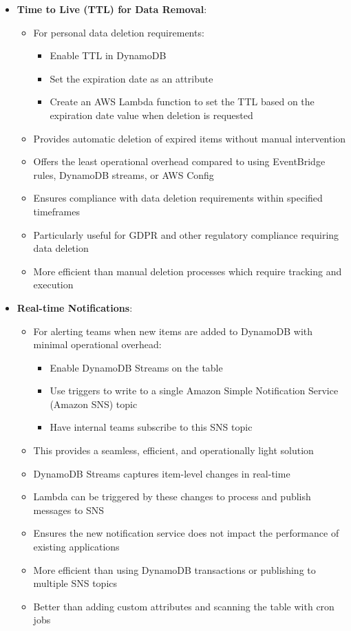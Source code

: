 \documentclass[11pt,a4paper]{report}
\begin{document}
\begin{itemize}
\begin{itemize}
  \item Superior to streams-based solutions which require custom implementation
\end{itemize}
  \item \textbf{Time to Live (TTL) for Data Removal}:
\begin{itemize}
  \item For personal data deletion requirements:
\begin{itemize}
  \item Enable TTL in DynamoDB
  \item Set the expiration date as an attribute
  \item Create an AWS Lambda function to set the TTL based on the expiration date value when deletion is requested
\end{itemize}
  \item Provides automatic deletion of expired items without manual intervention
  \item Offers the least operational overhead compared to using EventBridge rules, DynamoDB streams, or AWS Config
  \item Ensures compliance with data deletion requirements within specified timeframes
  \item Particularly useful for GDPR and other regulatory compliance requiring data deletion
  \item More efficient than manual deletion processes which require tracking and execution
\end{itemize}
  \item \textbf{Real-time Notifications}:
\begin{itemize}
  \item For alerting teams when new items are added to DynamoDB with minimal operational overhead:
\begin{itemize}
  \item Enable DynamoDB Streams on the table
  \item Use triggers to write to a single Amazon Simple Notification Service (Amazon SNS) topic
  \item Have internal teams subscribe to this SNS topic
\end{itemize}
  \item This provides a seamless, efficient, and operationally light solution
  \item DynamoDB Streams captures item-level changes in real-time
  \item Lambda can be triggered by these changes to process and publish messages to SNS
  \item Ensures the new notification service does not impact the performance of existing applications
  \item More efficient than using DynamoDB transactions or publishing to multiple SNS topics
  \item Better than adding custom attributes and scanning the table with cron jobs
\end{itemize}
\end{itemize}
\end{document}
